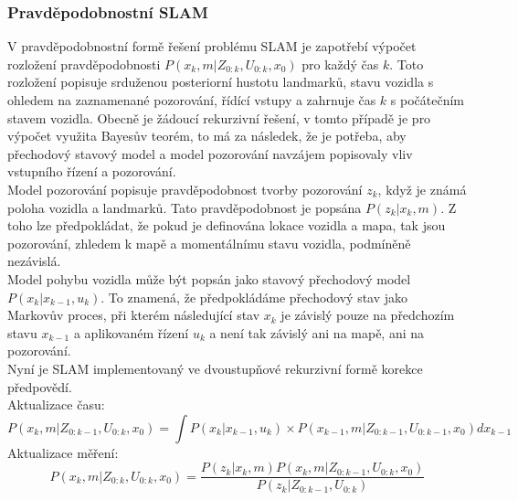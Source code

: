 \documentclass[11pt]{article}
\begin{document}
\subsubsection{Pravděpodobnostní SLAM}
V pravděpodobnostní formě řešení problému SLAM je zapotřebí výpočet rozložení pravděpodobnosti $P(x_k,m|Z_{0:k},U_{0:k},x_0)$ pro každý čas ${k}$. Toto rozložení popisuje srduženou posteriorní hustotu landmarků, stavu vozidla s ohledem na zaznamenané pozorování, řídící vstupy a zahrnuje čas ${k}$ s počátečním stavem vozidla. Obecně je žádoucí rekurzivní řešení, v tomto případě je pro výpočet využita Bayesův teorém, to má za následek, že je potřeba, aby přechodový stavový model a model pozorování navzájem popisovaly vliv vstupního řízení a pozorování.\\
\indent Model pozorování popisuje pravděpodobnost tvorby pozorování $z_k$, když je známá poloha vozidla a landmarků. Tato pravděpodobnost je popsána $P(z_k|x_k,m)$. Z toho lze předpokládat, že pokud je definována lokace vozidla a mapa, tak jsou pozorování, zhledem k mapě a momentálnímu stavu vozidla, podmíněně nezávislá. \\
Model pohybu vozidla může být popsán jako stavový přechodový model $P(x_k|x_{k-1},u_k)$. To znamená, že předpokládáme přechodový stav jako Markovův proces, při kterém následující stav $x_k$ je závislý pouze na předchozím stavu $x_{k-1}$ a aplikovaném řízení $u_k$ a není tak závislý ani na mapě, ani na pozorování.\\
\indent Nyní je SLAM implementovaný ve dvoustupňové rekurzivní formě korekce předpovědí. \\
Aktualizace času:
$$P(x_k,m|Z_{0:k-1},U_{0:k},x_0)=\int P(x_k|x_{k-1},u_k)\times P(x_{k-1},m|Z_{0:k-1},U_{0:k-1},x_0)dx_{k-1}$$ 
Aktualizace měření:
$$P(x_k,m|Z_{0:k},U_{0:k},x_0)=\frac{P(z_k|x_k,m)P(x_k,m|Z_{0:k-1},U_{0:k},x_0)}{P(z_k|Z_{0:k-1},U_{0:k})}$$
\end{document}
